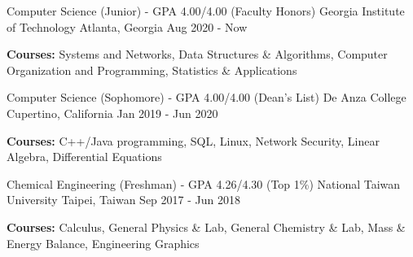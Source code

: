 

\begin{cventries}

  \cventry
    {Computer Science (Junior) - GPA 4.00/4.00 (Faculty Honors)} %
    {Georgia Institute of Technology} %
    {Atlanta, Georgia} %
    {Aug 2020 - Now} %
   {
		\vspace{-5.0mm}
		\item {\textbf{Courses:} Systems and Networks, Data Structures \& Algorithms, Computer Organization and Programming, Statistics \& Applications} 
   }

  \cventry
    {Computer Science (Sophomore) - GPA 4.00/4.00 (Dean's List)} %
    {De Anza College} %
    {Cupertino, California} %
    {Jan 2019 - Jun 2020} %
   {
		\vspace{-5.0mm}
		\item {\textbf{Courses:} C++/Java programming, SQL, Linux, Network Security, Linear Algebra, Differential Equations}
   }

  \cventry
    {Chemical Engineering (Freshman) - GPA 4.26/4.30 (Top 1\%)} %
    {National Taiwan University} %
    {Taipei, Taiwan} %
    {Sep 2017 - Jun 2018} %
    {
		\vspace{-5.0mm}
		\item {\textbf{Courses:} Calculus, General Physics \& Lab, General Chemistry \& Lab, Mass \& Energy Balance, Engineering Graphics}
	}

\end{cventries}
